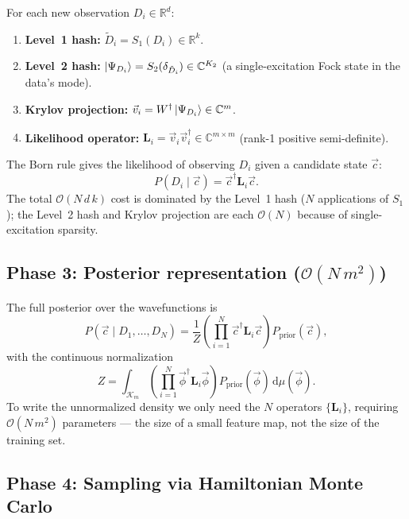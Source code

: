 \documentclass[11pt, a4paper]{article}
\newcommand{\Kry}{\mathcal{K}}
\newcommand{\Rset}{\mathbb{R}}
\newcommand{\Cset}{\mathbb{C}}
\begin{document}
For each new observation $D_i\in\Rset^d$:
\begin{enumerate}
\item \textbf{Level~1 hash:} $\tilde D_i=S_1(D_i)\in\Rset^k$.
\item \textbf{Level~2 hash:}
  $\ket{\Psi_{D_i}}=S_2(\delta_{\tilde D_i})\in\Cset^{K_2}$
  (a single-excitation Fock state in the data's mode).
\item \textbf{Krylov projection:}
  $\vec v_i=W^\dagger\ket{\Psi_{D_i}}\in\Cset^m$.
\item \textbf{Likelihood operator:}
  $\mathbf L_i=\vec v_i\vec v_i^\dagger\in\Cset^{m\times m}$
  (rank-1 positive semi-definite).
\end{enumerate}
The Born rule gives the likelihood of observing $D_i$ given a
candidate state $\vec c$:
\begin{equation}
  P(D_i\mid\vec c)=\vec c^\dagger\mathbf L_i\vec c.
  \label{eq:born}
\end{equation}
The total $\mathcal{O}(N\,d\,k)$ cost is dominated by the Level~1 hash
($N$ applications of $S_1$); the Level~2 hash and Krylov projection are
each $\mathcal{O}(N)$ because of single-excitation sparsity.

\subsection{Phase 3: Posterior representation ($\mathcal{O}(N\,m^2)$)}

The full posterior over the wavefunctions is
\begin{equation}
  P(\vec c\mid D_1,\dots,D_N)=\frac{1}{Z}
  \left(\prod_{i=1}^{N}\vec c^\dagger\mathbf L_i\vec c\right)
  P_{\mathrm{prior}}(\vec c),
  \label{eq:posterior}
\end{equation}
with the continuous normalization
\begin{equation}
  Z=\int_{\Kry_m}\left(\prod_{i=1}^N\vec\phi^\dagger\mathbf L_i\vec\phi\right)
  P_{\mathrm{prior}}(\vec\phi)\,\mathrm{d}\mu(\vec\phi).
  \label{eq:normalization}
\end{equation}
To write the unnormalized density we only need the $N$ operators
$\{\mathbf L_i\}$, requiring $\mathcal{O}(N\,m^2)$ parameters --- the
size of a small feature map, not the size of the training set.

\subsection{Phase 4: Sampling via Hamiltonian Monte Carlo}
\end{document}
